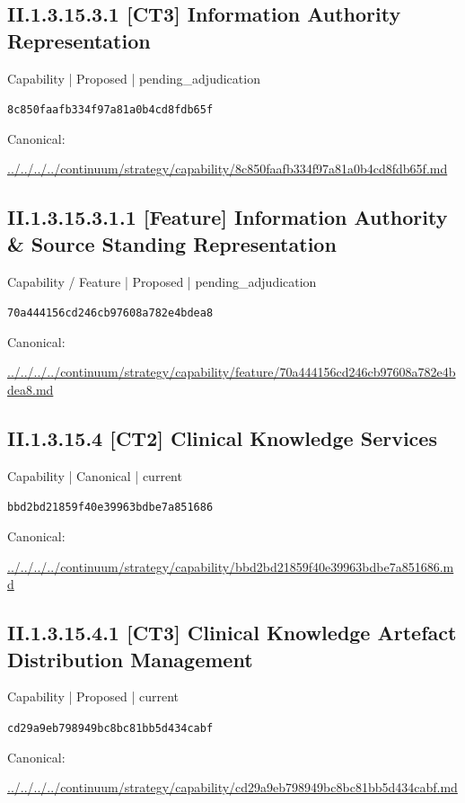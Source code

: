 \documentclass[10pt,a4paper]{article}
\begin{document}
\subsection*{II.1.3.15.3.1 [CT3] Information Authority Representation}
{\small Capability | Proposed | pending\_adjudication}\par
\texttt{8c850faafb334f97a81a0b4cd8fdb65f}\par
Canonical: \par
{\footnotesize\url{../../../../continuum/strategy/capability/8c850faafb334f97a81a0b4cd8fdb65f.md}}\par
\subsection*{II.1.3.15.3.1.1 [Feature] Information Authority \& Source Standing Representation}
{\small Capability / Feature | Proposed | pending\_adjudication}\par
\texttt{70a444156cd246cb97608a782e4bdea8}\par
Canonical: \par
{\footnotesize\url{../../../../continuum/strategy/capability/feature/70a444156cd246cb97608a782e4bdea8.md}}\par
\subsection*{II.1.3.15.4 [CT2] Clinical Knowledge Services}
{\small Capability | Canonical | current}\par
\texttt{bbd2bd21859f40e39963bdbe7a851686}\par
Canonical: \par
{\footnotesize\url{../../../../continuum/strategy/capability/bbd2bd21859f40e39963bdbe7a851686.md}}\par
\subsection*{II.1.3.15.4.1 [CT3] Clinical Knowledge Artefact Distribution Management}
{\small Capability | Proposed | current}\par
\texttt{cd29a9eb798949bc8bc81bb5d434cabf}\par
Canonical: \par
{\footnotesize\url{../../../../continuum/strategy/capability/cd29a9eb798949bc8bc81bb5d434cabf.md}}\par
\end{document}
